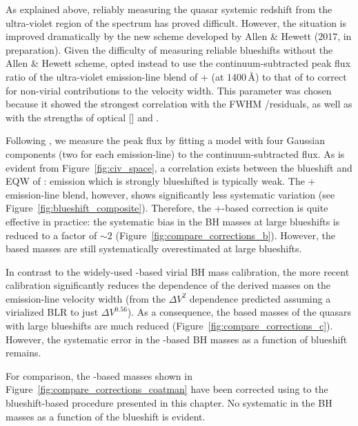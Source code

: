 As explained above, reliably measuring the quasar systemic redshift from the ultra-violet region of the spectrum has proved difficult. 
However, the situation is improved dramatically by the new scheme developed by Allen \& Hewett (2017, in preparation). 
Given the difficulty of measuring reliable  blueshifts without the Allen \& Hewett scheme, \citet{runnoe13} opted instead to use the continuum-subtracted peak flux ratio of the ultra-violet emission-line blend of + (at $1400$\,\AA) to that of  to correct for non-virial contributions to the  velocity width. 
This parameter was chosen because it showed the strongest correlation with the FWHM /\hb residuals, as well as with the strengths of optical [] and . 

Following \citet{runnoe13}, we measure the peak flux by fitting a model with four Gaussian components (two for each emission-line) to the continuum-subtracted flux.
As is evident from Figure~\ref{fig:civ_space}, a correlation exists between the blueshift and EQW of :  emission which is strongly blueshifted is typically weak. 
The + emission-line blend, however, shows significantly less systematic variation (see Figure~\ref{fig:blueshift_composite}). 
Therefore, the +-based correction is quite effective in practice: the systematic bias in the  BH masses at large  blueshifts is reduced to a factor of $\sim2$ (Figure~\ref{fig:compare_corrections_b}).
However, the  based masses are still systematically overestimated at large  blueshifts. 

In contrast to the widely-used \citet{vestergaard06} -based virial BH mass calibration, the more recent \citet{park13} calibration significantly reduces the dependence of the derived masses on the emission-line velocity width (from the $\Delta V^2$ dependence predicted assuming a virialized BLR to just $\Delta V^{0.56}$).
As a consequence, the  based masses of the quasars with large  blueshifts are much reduced (Figure~\ref{fig:compare_corrections_c}).
However, the systematic error in the -based BH masses as a function of  blueshift remains. 

For comparison, the -based masses shown in Figure~\ref{fig:compare_corrections_coatman} have been corrected using to the  blueshift-based procedure presented in this chapter. 
No systematic in the BH masses as a function of the  blueshift is evident. 

